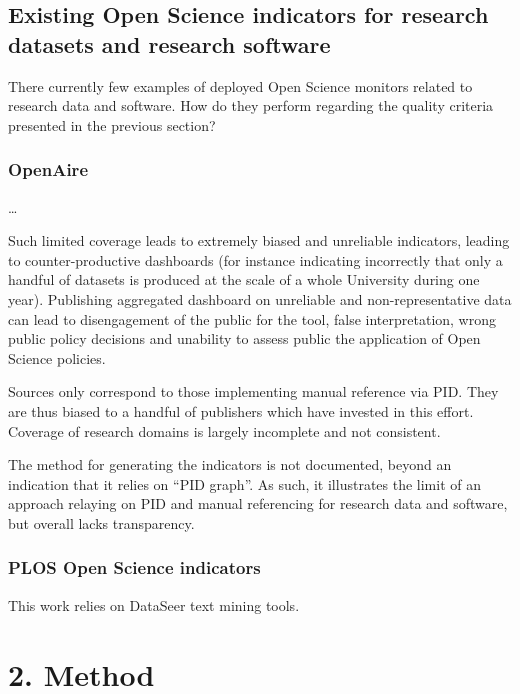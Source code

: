 \documentclass[
]{article}
\begin{document}
\hypertarget{existing-open-science-indicators-for-research-datasets-and-research-software}{%
\subsection{Existing Open Science indicators for research datasets and
research
software}\label{existing-open-science-indicators-for-research-datasets-and-research-software}}

There currently few examples of deployed Open Science monitors related
to research data and software. How do they perform regarding the quality
criteria presented in the previous section?

\hypertarget{openaire}{%
\subsubsection{OpenAire}\label{openaire}}

\ldots{}

Such limited coverage leads to extremely biased and unreliable
indicators, leading to counter-productive dashboards (for instance
indicating incorrectly that only a handful of datasets is produced at
the scale of a whole University during one year). Publishing aggregated
dashboard on unreliable and non-representative data can lead to
disengagement of the public for the tool, false interpretation, wrong
public policy decisions and unability to assess public the application
of Open Science policies.

Sources only correspond to those implementing manual reference via PID.
They are thus biased to a handful of publishers which have invested in
this effort. Coverage of research domains is largely incomplete and not
consistent.

The method for generating the indicators is not documented, beyond an
indication that it relies on ``PID graph''. As such, it illustrates the
limit of an approach relaying on PID and manual referencing for research
data and software, but overall lacks transparency.

\hypertarget{plos-open-science-indicators}{%
\subsubsection{PLOS Open Science
indicators}\label{plos-open-science-indicators}}

This work relies on DataSeer text mining tools.

\hypertarget{method}{%
\section{2. Method}\label{method}}
\end{document}
